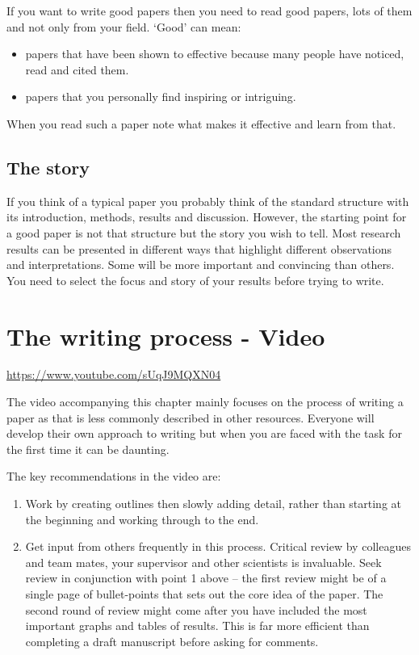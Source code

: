 \documentclass[
  titlepage]{book}
\providecommand{\tightlist}{%
  \setlength{\itemsep}{0pt}\setlength{\parskip}{0pt}}
\begin{document}
If you want to write good papers then you need to read good papers, lots of them and not only from your field. `Good' can mean:

\begin{itemize}
\tightlist
\item
  papers that have been shown to effective because many people have noticed, read and cited them.
\item
  papers that you personally find inspiring or intriguing.
\end{itemize}

When you read such a paper note what makes it effective and learn from that.

\hypertarget{the-story}{%
\subsection{The story}\label{the-story}}

If you think of a typical paper you probably think of the standard structure with its introduction, methods, results and discussion. However, the starting point for a good paper is not that structure but the story you wish to tell. Most research results can be presented in different ways that highlight different observations and interpretations. Some will be more important and convincing than others. You need to select the focus and story of your results before trying to write.

\hypertarget{the-writing-process---video}{%
\section{The writing process - Video}\label{the-writing-process---video}}

\label{fig:unnamed-chunk-36}\url{https://www.youtube.com/sUqJ9MQXN04}

The video accompanying this chapter mainly focuses on the process of writing a paper as that is less commonly described in other resources. Everyone will develop their own approach to writing but when you are faced with the task for the first time it can be daunting.

The key recommendations in the video are:

\begin{enumerate}
\def\labelenumi{\arabic{enumi}.}
\item
  Work by creating outlines then slowly adding detail, rather than starting at the beginning and working through to the end.
\item
  Get input from others frequently in this process. Critical review by colleagues and team mates, your supervisor and other scientists is invaluable. Seek review in conjunction with point 1 above -- the first review might be of a single page of bullet-points that sets out the core idea of the paper. The second round of review might come after you have included the most important graphs and tables of results. This is far more efficient than completing a draft manuscript before asking for comments.
\end{enumerate}
\end{document}
